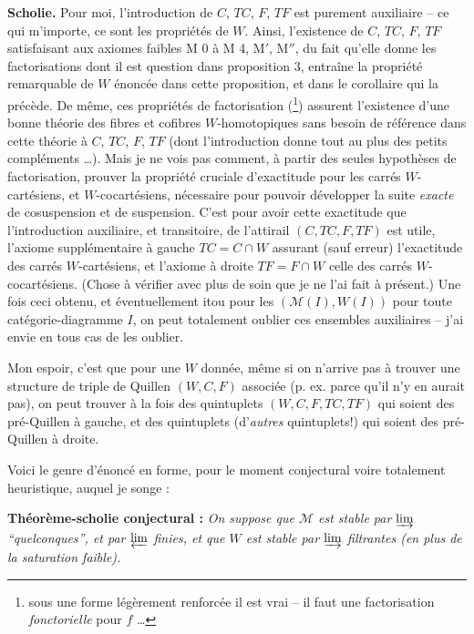 \documentclass[11pt]{article}
\newcommand{\printedpage}[1]{\marginpar{\footnotesize p.~#1}}
\newcommand{\msp}[1]{\marginpar{\footnotesize [#1]}}
\newcommand{\cM}{\mathcal{M}}
\begin{document}
\textbf{Scholie.} Pour moi, l'introduction de $C$, $TC$, $F$, $TF$ est purement auxiliaire – ce qui m'importe, ce sont les propriétés de $W$. Ainsi, l'existence de $C$, $TC$, $F$, $TF$ satisfaisant aux axiomes faibles M 0 à M 4, M$'$, M$''$, du fait qu'elle donne les factorisations
\msp{page 13}
dont il est question dans proposition 3, entraîne la propriété remarquable de $W$ énoncée dans cette proposition, et dans le corollaire qui la précède. De même, ces propriétés de factorisation (\footnote{sous une forme légèrement renforcée il est vrai – il faut une factorisation \textit{fonctorielle} pour $f$ \dots}) assurent l'existence d'une bonne théorie des fibres et cofibres $W$-homotopiques sans besoin de référence dans cette théorie à $C$, $TC$, $F$, $TF$ (dont l'introduction donne tout au plus des petits compléments \dots). Mais je ne vois pas comment, à partir des seules hypothèses de factorisation, prouver la propriété cruciale d'exactitude pour les carrés $W$-cartésiens, et $W$-cocartésiens, nécessaire pour pouvoir développer la suite \textit{exacte} de cosuspension et de suspension. C'est pour avoir cette exactitude que l'introduction auxiliaire, et transitoire, de l'attirail $(C,TC,F,TF)$ est utile, l'axiome supplémentaire à gauche $TC=C\cap W$ assurant (sauf erreur) l'exactitude des carrés $W$-cartésiens, et l'axiome à droite $TF=F\cap W$ celle des carrés $W$-cocartésiens. (Chose à vérifier avec plus de soin que je ne l'ai fait à présent.) Une fois ceci obtenu, et éventuellement itou pour les $(\cM(I),W(I))$ pour toute catégorie-diagramme $I$, on peut
\msp{page 14}
totalement oublier ces ensembles auxiliaires – j'ai envie en tous cas de les oublier.

Mon espoir, c'est que pour une $W$ donnée, même si on n'arrive pas à trouver une structure de triple de Quillen $(W,C,F)$ associée (p. ex. parce qu'il n'y en aurait pas), on peut trouver à la fois des quintuplets $(W,C,F,TC,TF)$ qui soient des pré-Quillen à gauche, et des quintuplets (d'\textit{autres} quintuplets!) qui soient des pré-Quillen à droite.

Voici le genre d'énoncé en forme, pour le moment conjectural voire totalement heuristique, auquel je songe :

\textbf{Théorème-scholie conjectural :} \textit{On suppose que $\cM$ est stable par $\varinjlim$ “quelconques”, et par $\varprojlim$ finies, et que $W$ est stable par $\varinjlim$ filtrantes (en plus de la saturation faible).}

\printedpage{9}
\end{document}
